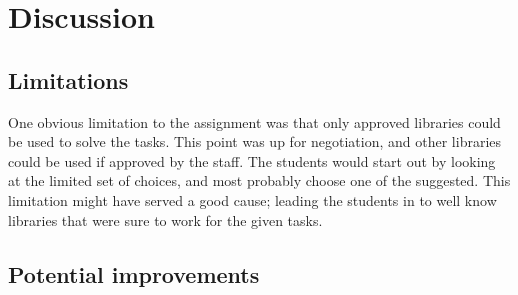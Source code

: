 \chapter{Discussion}
\label{cha:discussion}

\section{Limitations}
One obvious limitation to the assignment was that only approved libraries could be used to solve the tasks. This point was up for negotiation, and other libraries could be used if approved by the staff. The students would start out by looking at the limited set of choices, and most probably choose one of the suggested. This limitation might have served a good cause; leading the students in to well know libraries that were sure to work for the given tasks.

\section{Potential improvements}






